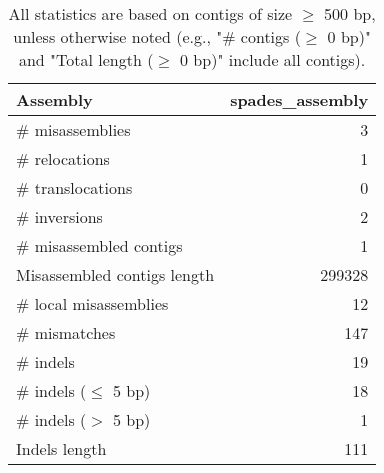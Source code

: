 \documentclass[12pt,a4paper]{article}
\begin{document}
\begin{table}[ht]
\begin{center}
\caption{All statistics are based on contigs of size $\geq$ 500 bp, unless otherwise noted (e.g., "\# contigs ($\geq$ 0 bp)" and "Total length ($\geq$ 0 bp)" include all contigs).}
\begin{tabular}{|l*{1}{|r}|}
\hline
Assembly & spades\_assembly \\ \hline
\# misassemblies & 3 \\ \hline
\hspace{5mm}\# relocations & 1 \\ \hline
\hspace{5mm}\# translocations & 0 \\ \hline
\hspace{5mm}\# inversions & 2 \\ \hline
\# misassembled contigs & 1 \\ \hline
Misassembled contigs length & 299328 \\ \hline
\# local misassemblies & 12 \\ \hline
\# mismatches & 147 \\ \hline
\# indels & 19 \\ \hline
\hspace{5mm}\# indels ($\leq$ 5 bp) & 18 \\ \hline
\hspace{5mm}\# indels ($>$ 5 bp) & 1 \\ \hline
Indels length & 111 \\ \hline
\end{tabular}
\end{center}
\end{table}
\end{document}
